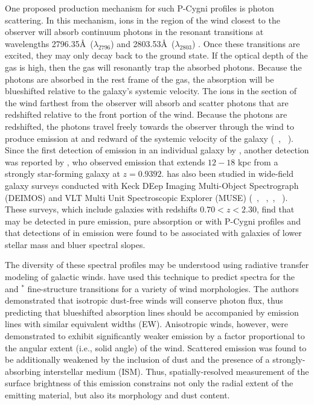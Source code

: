 \documentclass[twocolumn]{aastex61}
\newcommand{\citethnop}[1]{\citeauthor{#1}\ \citeyear{#1}}
\begin{document}
One proposed production mechanism for such P-Cygni profiles is photon scattering. In this mechanism,  ions in the region of the wind closest to the observer will absorb continuum photons in the resonant transitions at wavelengths 2796.35\AA\ ($\lambda_{2796}$) and 2803.53\AA\ ($\lambda_{2803}$) \citep{Morton2003}. Once these transitions are excited, they may only decay back to the ground state. If the optical depth of the gas is high, then the gas will resonantly trap the absorbed photons. Because the photons are absorbed in the rest frame of the gas, the absorption will be blueshifted relative to the galaxy's systemic velocity. The  ions in the section of the wind farthest from the observer will absorb and scatter photons that are redshifted relative to the front portion of the wind. Because the photons are redshifted, the photons travel freely towards the observer through the wind to produce emission at and redward of the systemic velocity of the galaxy (\citethnop{Rubin_2011}, \citethnop{Prochaska_2011}). Since the first detection of  emission in an individual galaxy by \citet{Rubin_2011}, another detection was reported by \cite{Martin2013}, who observed  emission that extends $12-18$ kpc from a strongly star-forming galaxy
at $z=0.9392$.  has also been studied in wide-field galaxy surveys conducted with Keck DEep Imaging Multi-Object Spectrograph (DEIMOS) and VLT Multi Unit Spectroscopic Explorer (MUSE)  (\citethnop{Weiner2009}, \citethnop{Kornei2013},\citethnop{Erb2012}, \citethnop{Feltre2018}). These surveys, which include galaxies with redshifts $ 0.70 < z < 2.30$, find that  may be detected in pure emission, pure absorption or with P-Cygni profiles and that detections of  in emission were found to be associated with galaxies of lower stellar mass and bluer spectral slopes.

The diversity of these spectral profiles may be understood using radiative transfer modeling of galactic winds. \citet{Prochaska_2011} have used this technique to predict 
spectra for the   and  $^*$ fine-structure transitions for a variety of wind morphologies. The authors demonstrated that isotropic dust-free winds will conserve photon flux, thus predicting that blueshifted absorption lines should be accompanied by emission lines with similar equivalent widths (EW). Anisotropic winds, however, were demonstrated to exhibit significantly weaker emission by a factor proportional to the angular extent (i.e., solid angle) of the wind. Scattered emission was found to be additionally weakened by the inclusion of dust and the presence of a strongly-absorbing interstellar medium (ISM). Thus, spatially-resolved measurement of the surface brightness of this emission constrains not only the radial extent of the emitting material, but also its morphology and dust content.
\end{document}
